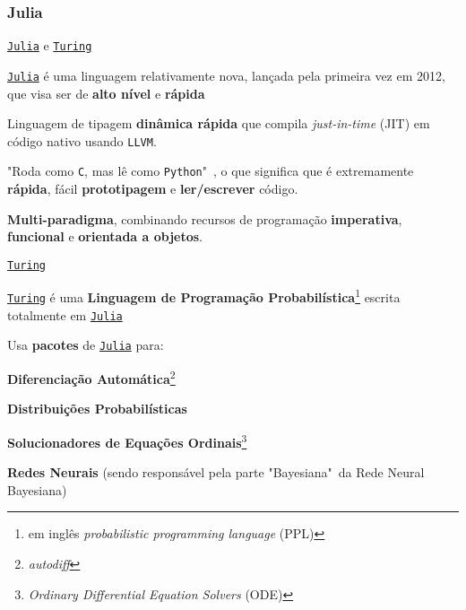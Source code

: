 \subsubsection{Julia}
\begin{frame}{\href{https://julialang.org/}{\texttt{Julia}} e \href{https://turing.ml}{\texttt{Turing}}}
	\begin{vfilleditems}
		\item \href{https://julialang.org/}{\texttt{Julia}} \parencite{bezanson2017julia} é uma linguagem relativamente nova, lançada pela primeira vez em 2012, que visa ser de \textbf{alto nível} e \textbf{rápida}
		\item Linguagem de tipagem \textbf{dinâmica rápida} que compila \textit{just-in-time} (JIT) em código nativo usando \texttt{LLVM}.
		\item "Roda como \texttt{C}, mas lê como \texttt{Python}"~\parencite{perkelJuliaComeSyntax2019}, o que significa que é extremamente \textbf{rápida}, fácil \textbf{prototipagem} e \textbf{ler/escrever} código.
		\item \textbf{Multi-paradigma}, combinando recursos de programação \textbf{imperativa}, \textbf{funcional} e \textbf{orientada a objetos}.
	\end{vfilleditems}
\end{frame}

\begin{frame}{\href{https://turing.ml}{\texttt{Turing}}}
	\begin{vfilleditems}
		\item \href{https://turing.ml}{\texttt{Turing}} é uma \textbf{Linguagem de Programação Probabilística}\footnote{em inglês \textit{probabilistic programming language} (PPL)} escrita totalmente em \href{https://julialang.org/}{\texttt{Julia}}
		\item Usa \textbf{pacotes} de \href{https://julialang.org/}{\texttt{Julia}} para:
		\begin{vfilleditems}
			\item \textbf{Diferenciação Automática}\footnote{\textit{autodiff}}
			\item \textbf{Distribuições Probabilísticas}
			\item \textbf{Solucionadores de Equações Ordinais}\footnote{\textit{Ordinary Differential Equation Solvers} (ODE)}
			\item \textbf{Redes Neurais} (sendo responsável pela parte "Bayesiana"~da Rede Neural Bayesiana)
		\end{vfilleditems}
	\end{vfilleditems}
\end{frame}

